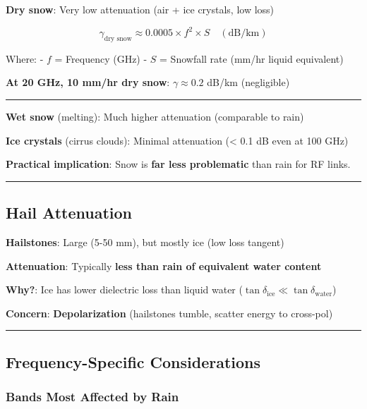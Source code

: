\textbf{Dry snow}: Very low attenuation (air + ice crystals, low loss)

\[
\gamma_{\text{dry snow}} \approx 0.0005 \times f^2 \times S \quad (\text{dB/km})
\]

Where: - \(f\) = Frequency (GHz) - \(S\) = Snowfall rate (mm/hr liquid
equivalent)

\textbf{At 20 GHz, 10 mm/hr dry snow}: \(\gamma \approx 0.2\) dB/km
(negligible)

\begin{center}\rule{0.5\linewidth}{0.5pt}\end{center}

\textbf{Wet snow} (melting): Much higher attenuation (comparable to
rain)

\textbf{Ice crystals} (cirrus clouds): Minimal attenuation (\textless{}
0.1 dB even at 100 GHz)

\textbf{Practical implication}: Snow is \textbf{far less problematic}
than rain for RF links.

\begin{center}\rule{0.5\linewidth}{0.5pt}\end{center}

\subsection{Hail Attenuation}\label{hail-attenuation}

\textbf{Hailstones}: Large (5-50 mm), but mostly ice (low loss tangent)

\textbf{Attenuation}: Typically \textbf{less than rain of equivalent
water content}

\textbf{Why?}: Ice has lower dielectric loss than liquid water
(\(\tan \delta_{\text{ice}} \ll \tan \delta_{\text{water}}\))

\textbf{Concern}: \textbf{Depolarization} (hailstones tumble, scatter
energy to cross-pol)

\begin{center}\rule{0.5\linewidth}{0.5pt}\end{center}

\subsection{Frequency-Specific
Considerations}\label{frequency-specific-considerations}

\subsubsection{Bands Most Affected by
Rain}\label{bands-most-affected-by-rain}

